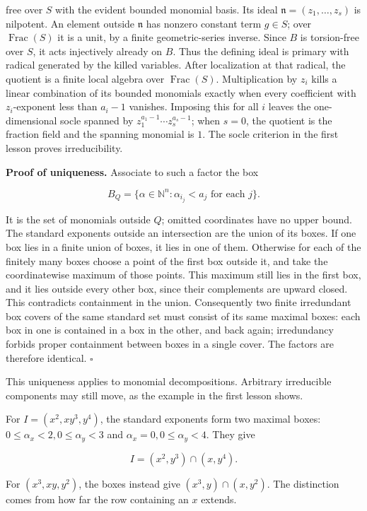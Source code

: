 \documentclass[
]{article}
\begin{document}
free over \(S\) with the evident bounded monomial basis. Its ideal
\(\mathfrak n=(z_1,\ldots,z_s)\) is nilpotent. An element outside
\(\mathfrak n\) has nonzero constant term \(g\in S\); over
\(\operatorname{Frac}(S)\) it is a unit, by a finite geometric-series
inverse. Since \(B\) is torsion-free over \(S\), it acts injectively
already on \(B\). Thus the defining ideal is primary with radical
generated by the killed variables. After localization at that radical,
the quotient is a finite local algebra over \(\operatorname{Frac}(S)\).
Multiplication by \(z_i\) kills a linear combination of its bounded
monomials exactly when every coefficient with \(z_i\)-exponent less than
\(a_i-1\) vanishes. Imposing this for all \(i\) leaves the
one-dimensional socle spanned by \(z_1^{a_1-1}\cdots z_s^{a_s-1}\); when
\(s=0\), the quotient is the fraction field and the spanning monomial is
\(1\). The socle criterion in the first lesson proves irreducibility.

\textbf{Proof of uniqueness.} Associate to such a factor the box

\[
B_Q=\{\alpha\in\mathbb N^n:\alpha_{i_j}<a_j\text{ for each }j\}.
\]

It is the set of monomials outside \(Q\); omitted coordinates have no
upper bound. The standard exponents outside an intersection are the
union of its boxes. If one box lies in a finite union of boxes, it lies
in one of them. Otherwise for each of the finitely many boxes choose a
point of the first box outside it, and take the coordinatewise maximum
of those points. This maximum still lies in the first box, and it lies
outside every other box, since their complements are upward closed. This
contradicts containment in the union. Consequently two finite
irredundant box covers of the same standard set must consist of its same
maximal boxes: each box in one is contained in a box in the other, and
back again; irredundancy forbids proper containment between boxes in a
single cover. The factors are therefore identical. \(\square\)

This uniqueness applies to monomial decompositions. Arbitrary
irreducible components may still move, as the example in the first
lesson shows.

For \(I=(x^2,xy^3,y^4)\), the standard exponents form two maximal boxes:
\(0\le\alpha_x<2,0\le\alpha_y<3\) and \(\alpha_x=0,0\le\alpha_y<4\).
They give

\[
I=(x^2,y^3)\cap(x,y^4).
\]

For \((x^3,xy,y^2)\), the boxes instead give \((x^3,y)\cap(x,y^2)\). The
distinction comes from how far the row containing an \(x\) extends.
\end{document}
